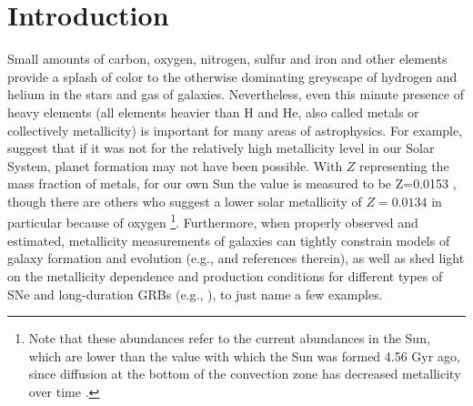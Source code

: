 \documentclass{emulateapj}
\begin{document}
\section{Introduction}
Small amounts of carbon, oxygen, nitrogen, sulfur and iron and
 other elements provide a splash of color to the otherwise dominating greyscape of hydrogen and helium in the stars and gas of galaxies. Nevertheless, even this 
minute presence of heavy elements (all elements heavier than H and He, also called metals or collectively metallicity) is important for many areas of astrophysics. For example, \citet{johnson12} 
suggest that if it was not for the relatively high metallicity level in our Solar System, planet formation may not have been possible. With $Z$ representing the mass fraction of metals, for our own Sun the value is measured to be  Z=0.0153 \citep{chaffau11}, though there are others who suggest a lower solar metallicity of $Z=0.0134$ in particular because of oxygen \citep{asplund09_rev,grevesse10}\footnote{Note that these abundances refer to the current abundances in the Sun, which are lower than the value with which the Sun was formed 4.56 Gyr ago, since diffusion at the bottom of the convection zone has decreased metallicity over time \citep{grevesse10}.%
}. Furthermore, when properly observed and estimated, metallicity measurements of galaxies can tightly constrain models of galaxy formation and evolution (e.g., \citealt{kewley08} and references therein), as well as shed light on the metallicity dependence and production conditions for different types of SNe and long-duration GRBs (e.g., \citealt{modjaz08_Z,levesque10_grbhosts,anderson10,modjaz11,kelly12,sanders12,lunnan14,leloudas14}), to just name a few examples.
\end{document}
